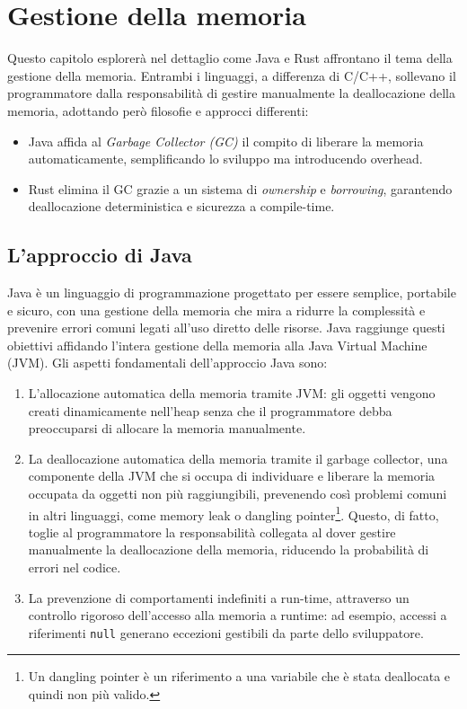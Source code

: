 
\chapter{Gestione della memoria}
Questo capitolo esplorerà nel dettaglio come Java e Rust affrontano il tema della gestione della memoria. Entrambi i linguaggi, a differenza di C/C++, sollevano il programmatore dalla responsabilità di gestire manualmente la deallocazione della memoria, adottando però filosofie e approcci differenti:
\begin{itemize}
    \item Java affida al \textit{Garbage Collector (GC)} il compito di liberare la memoria automaticamente, semplificando lo sviluppo ma introducendo overhead. 
    \item Rust elimina il GC grazie a un sistema di \textit{ownership} e \textit{borrowing}, garantendo deallocazione deterministica e sicurezza a compile-time. 
\end{itemize}
\section{L'approccio di Java}
Java è un linguaggio di programmazione progettato per essere semplice, portabile e sicuro, con una gestione della memoria che mira a ridurre la complessità e prevenire errori comuni legati all'uso diretto delle risorse. Java raggiunge questi obiettivi affidando l'intera gestione della memoria alla Java Virtual Machine (JVM). Gli aspetti fondamentali dell'approccio Java sono:

\begin{enumerate}
\item L'allocazione automatica della memoria tramite JVM: gli oggetti vengono creati dinamicamente nell'heap senza che il programmatore debba preoccuparsi di allocare la memoria manualmente. 
\item La deallocazione automatica della memoria tramite il garbage collector, una componente della JVM che si occupa di individuare e liberare la memoria occupata da oggetti non più raggiungibili, prevenendo così problemi comuni in altri linguaggi, come memory leak o dangling pointer\footnote{Un dangling pointer è un riferimento a una variabile che è stata deallocata e quindi non più valido.}. Questo, di fatto, toglie al programmatore la responsabilità collegata al dover gestire manualmente la deallocazione della memoria, riducendo la probabilità di errori nel codice.
\item La prevenzione di comportamenti indefiniti a run-time, attraverso un controllo rigoroso dell'accesso alla memoria a runtime: ad esempio, accessi a riferimenti \texttt{null} generano eccezioni gestibili da parte dello sviluppatore. 
\end{enumerate}


